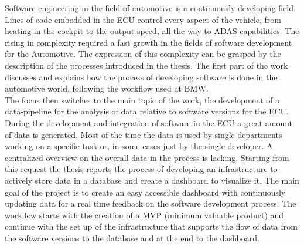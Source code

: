 \documentclass[../main.tex]{subfiles}
\begin{document}
Software engineering in the field of automotive is a continuously developing field. Lines of code embedded in the \gls{ECU} control every aspect of the vehicle, from heating in the cockpit to the output speed, all the way to \gls{ADAS} capabilities. The rising in complexity required a fast growth in the fields of software development for the Automotive. The expression of this complexity can be grasped by the description of the processes introduced in the thesis. The first part of the work discusses and explains how the process of developing software is done in the automotive world, following the workflow used at \gls{BMW}.\\
The focus then switches to the main topic of the work, the development of a data-pipeline for the analysis of data relative to software versions for the \gls{ECU}. During the development and integration of software in the \gls{ECU} a great amount of data is generated. Most of the time the data is used by single departments working on a specific task or, in some cases just by the single developer. A centralized overview on the overall data in the process is lacking. Starting from this request the thesis reports the process of developing an infrastructure to actively store data in a database and create a dashboard to visualize it. The main goal of the project is to create an easy accessible dashboard with continuously updating data for a real time feedback on the software development process. The workflow starts with the creation of a MVP (minimum valuable product) and continue with the set up of the infrastructure that supports the flow of data from the software versions to the database and at the end to the dashboard.\\
\cleardoublepage
\end{document}
